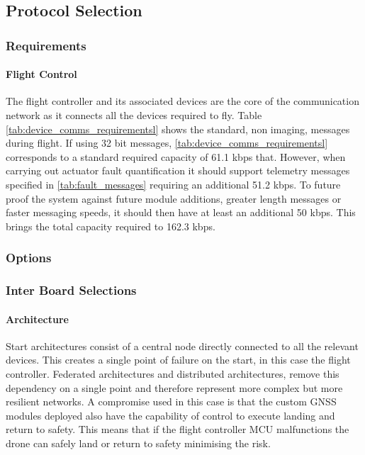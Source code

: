 \subsection{Protocol Selection}

\subsubsection{Requirements}
\paragraph{Flight Control}

The flight controller and its associated devices are the core of the communication network as it connects all the devices required to fly. Table \ref{tab:device_comms_requirementsl} shows the standard, non imaging, messages during flight. If using 32 bit messages, \ref{tab:device_comms_requirementsl} corresponds to a standard required capacity of 61.1 kbps that. However, when carrying out actuator fault quantification it should support telemetry messages specified in \ref{tab:fault_messages} requiring an additional 51.2 kbps. To future proof the system against future module additions, greater length messages or faster messaging speeds, it should then have at least an additional 50 kbps. This brings the total capacity required to 162.3 kbps.
\subsubsection{Options}


\subsubsection{Inter Board Selections}
\paragraph{Architecture}
Start architectures consist of a central node directly connected to all the relevant devices. This creates a single point of failure on the start, in this case the flight controller. Federated architectures and distributed architectures, remove this dependency on a single point and therefore represent more complex but more resilient networks. A compromise used in this case is that the custom \gls{GNSS} modules deployed also have the capability of control to execute landing and return to safety. This means that if the flight controller \gls{MCU} malfunctions the drone can safely land or return to safety minimising the risk.  
